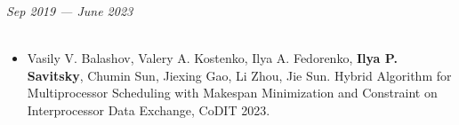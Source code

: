 \documentclass{resume}
\begin{document}


\begin{rSection}{}

{\bf {} } \hfill {\em Sep 2019 --- June 2023}
\\{\bf {}}
\\{ \textit { }}

\end{rSection}

\begin{rSection}{}
\begin{itemize}
\item Vasily V. Balashov, Valery A. Kostenko, Ilya A. Fedorenko, \textbf{Ilya P. Savitsky}, Chumin Sun, Jiexing Gao, Li Zhou, Jie Sun. Hybrid Algorithm for Multiprocessor Scheduling with Makespan Minimization and Constraint on Interprocessor Data Exchange, CoDIT 2023. \; 
\end{itemize}
\end{rSection}
\end{document}
